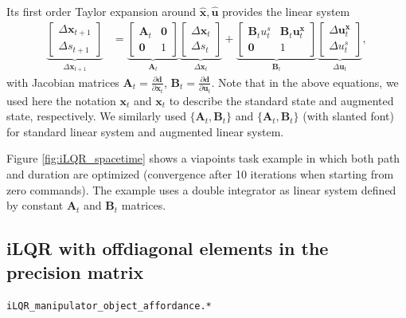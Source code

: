 \documentclass[10pt,a4paper]{article} %
\newcommand{\filename}[1]{\colorbox{rr2}{\color{white}\texttt{#1}}}
\begin{document}
Its first order Taylor expansion around $\bm{\hat{x}},\bm{\hat{u}}$ provides the linear system
\begin{align*}
	\underbrace{\begin{bmatrix} \Delta\mathbf{x}_{t+1} \\ \Delta s_{t+1} \end{bmatrix}}_{\Delta\bm{x}_{t+1}}
 	&=
	\underbrace{\begin{bmatrix} \mathbf{A}_t & \bm{0} \\ \bm{0} & 1 \end{bmatrix}}_{\bm{A}_t}
	\underbrace{\begin{bmatrix} \Delta\mathbf{x}_t \\ \Delta s_t \end{bmatrix}}_{\Delta\bm{x}_t}
	+
	\underbrace{\begin{bmatrix} \mathbf{B}_t u^s_t & \mathbf{B}_t \bm{u}^{\mathbf{x}}_t \\ \bm{0} & 1 \end{bmatrix}}_{\bm{B}_t} %
	\underbrace{\begin{bmatrix} \Delta\bm{u}^{\mathbf{x}}_t \\ \Delta u^s_t \end{bmatrix}}_{\Delta\bm{u}_t},
\end{align*}
with Jacobian matrices $\bm{A}_t \!=\! \frac{\partial\bm{d}}{\partial\bm{x}_t}$, $\bm{B}_t \!=\! \frac{\partial\bm{d}}{\partial\bm{u}_t}$. Note that in the above equations, we used here the notation $\mathbf{x}_t$ and $\bm{x}_t$ to describe the standard state and augmented state, respectively. We similarly used $\{\mathbf{A}_t,\mathbf{B}_t\}$ and $\{\bm{A}_t,\bm{B}_t\}$ (with slanted font) for standard linear system and augmented linear system.

Figure \ref{fig:iLQR_spacetime} shows a viapoints task example in which both path and duration are optimized (convergence after 10 iterations when starting from zero commands). The example uses a double integrator as linear system defined by constant $\mathbf{A}_t$ and  $\mathbf{B}_t$ matrices.

\newpage

\subsection{iLQR with offdiagonal elements in the precision matrix} 
\begin{flushright}
\filename{iLQR\_manipulator\_object\_affordance.*}
\end{flushright}
\end{document}
